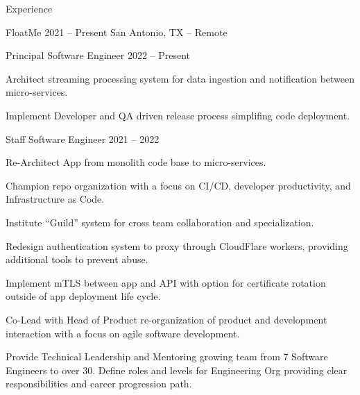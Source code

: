 \documentclass{resume}
\begin{document}
    \begin{rSection}{Experience}

        \begin{rSubsection}{FloatMe}
            {2021 -- Present} %
            {San Antonio, TX -- Remote} %
            \begin{rSubsubsection}{Principal Software Engineer} %
                {2022 -- Present} %
            \item Architect streaming processing system for data ingestion
                and notification between micro-services.
            \item Implement Developer and QA driven release process simplifing
                code deployment.
            \end{rSubsubsection}
            \begin{rSubsubsection}{Staff Software Engineer} %
                {2021 -- 2022} %
            \item Re-Architect App from monolith code base to micro-services.
            \item Champion repo organization with a focus on CI/CD, developer
                productivity, and Infrastructure as Code.
            \item Institute ``Guild'' system for cross team collaboration and
                specialization.
            \item Redesign authentication system to proxy through CloudFlare
                workers, providing additional tools to prevent abuse.
            \item Implement mTLS between app and API with option for
                certificate rotation outside of app deployment life cycle.
            \item Co-Lead with Head of Product re-organization of product
                and development interaction with a focus on agile software
                development.
            \item Provide Technical Leadership and Mentoring growing team from
                7 Software Engineers to over 30. Define roles and levels for
                Engineering Org providing clear responsibilities and career
                progression path.
            \end{rSubsubsection}
        \end{rSubsection}


\end{rSection}
\end{document}

